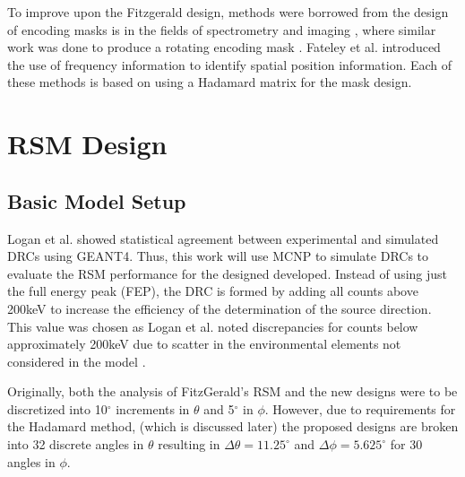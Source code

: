 \documentclass[3p,times]{elsarticle}
\begin{document}
To improve upon the Fitzgerald design, methods were borrowed from the design of encoding masks is in the fields of spectrometry and imaging \cite{Sloane76, Finger85, Hanley00, DeVerse00}, where similar work was done to produce a rotating encoding mask \cite{Bellamy97}.
Fateley et al.\cite{Fateley00} introduced the use of frequency information to identify spatial position information.
Each of these methods is based on using a Hadamard matrix for the mask design.

\section{RSM Design}
\subsection{Basic Model Setup}
Logan et al.\cite{Logan2017} showed statistical agreement between experimental and simulated DRCs using GEANT4.
Thus, this work will use MCNP to simulate DRCs to evaluate the RSM performance for the designed developed.  
Instead of using just the full energy peak (FEP), the DRC is formed by adding all counts above 200keV to increase the efficiency of the determination of the source direction.  
This value was chosen as Logan et al. noted discrepancies for counts below approximately 200keV due to scatter in the  environmental elements not considered in the model \cite{Logan2017}.

Originally, both the analysis of FitzGerald's RSM and the new designs were to be discretized into 10$^\circ$ increments in $\theta$ and 5$^\circ$ in $\phi$.  
However, due to requirements for the Hadamard method, (which is discussed later) 
the proposed designs are broken into 32 discrete angles in $\theta$ resulting in $\Delta\theta=11.25^\circ$ and $\Delta\phi=5.625^\circ$ for 30 angles in $\phi$.
\end{document}
